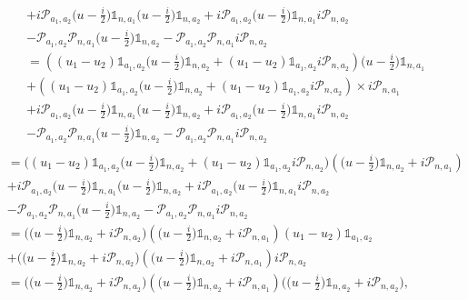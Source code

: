 \documentclass{homework}
\begin{document}
\begin{align*}
    &+ i \bm{\mathcal{P}}_{a_1, a_2} \bigg(u-\frac{i}{2}\bigg) \mathds{1}_{n, a_1}  \bigg(u-\frac{i}{2}\bigg) \mathds{1}_{n, a_2} + i \bm{\mathcal{P}}_{a_1, a_2} \bigg(u-\frac{i}{2}\bigg) \mathds{1}_{n, a_1} i \bm{\mathcal{P}}_{n, a_2} \\
    & - \bm{\mathcal{P}}_{a_1, a_2}  \bm{\mathcal{P}}_{n, a_1}  \bigg(u-\frac{i}{2}\bigg) \mathds{1}_{n, a_2} - \bm{\mathcal{P}}_{a_1, a_2}  \bm{\mathcal{P}}_{n, a_1} i \bm{\mathcal{P}}_{n, a_2} \\
    &= \left({(u_1-u_2) \mathds{1}_{a_1, a_2}  \bigg(u-\frac{i}{2}\bigg) \mathds{1}_{n, a_2}} + {(u_1-u_2) \mathds{1}_{a_1, a_2} i \bm{\mathcal{P}}_{n, a_2}}\right) \bigg(u-\frac{i}{2}\bigg) \mathds{1}_{n, a_1} \\ 
    &+ \left({(u_1-u_2) \mathds{1}_{a_1, a_2} \bigg(u-\frac{i}{2}\bigg) \mathds{1}_{n, a_2}} + {(u_1-u_2) \mathds{1}_{a_1, a_2} i \bm{\mathcal{P}}_{n, a_2}} \right) \times  i \bm{\mathcal{P}}_{n, a_1} \\
    &+ i \bm{\mathcal{P}}_{a_1, a_2} \bigg(u-\frac{i}{2}\bigg) \mathds{1}_{n, a_1} \bigg(u-\frac{i}{2}\bigg) \mathds{1}_{n, a_2} + i \bm{\mathcal{P}}_{a_1, a_2} \bigg(u-\frac{i}{2}\bigg) \mathds{1}_{n, a_1} i \bm{\mathcal{P}}_{n, a_2} \\
    & - \bm{\mathcal{P}}_{a_1, a_2}  \bm{\mathcal{P}}_{n, a_1}  \bigg(u-\frac{i}{2}\bigg) \mathds{1}_{n, a_2} - \bm{\mathcal{P}}_{a_1, a_2}  \bm{\mathcal{P}}_{n, a_1} i \bm{\mathcal{P}}_{n, a_2} \\
\end{align*}
\begin{align*}
    &= \bigg((u_1-u_2) \mathds{1}_{a_1, a_2} \bigg(u-\frac{i}{2}\bigg) \mathds{1}_{n, a_2} + {(u_1-u_2) \mathds{1}_{a_1, a_2} i \bm{\mathcal{P}}_{n, a_2}} \bigg) \left( \bigg(u-\frac{i}{2}\bigg) \mathds{1}_{n, a_2} + i \bm{\mathcal{P}}_{n, a_1} \right) \\
    &+ i \bm{\mathcal{P}}_{a_1, a_2} \bigg(u-\frac{i}{2}\bigg) \mathds{1}_{n, a_1} \bigg(u-\frac{i}{2}\bigg) \mathds{1}_{n, a_2} + i \bm{\mathcal{P}}_{a_1, a_2} \bigg(u-\frac{i}{2}\bigg) \mathds{1}_{n, a_1} i \bm{\mathcal{P}}_{n, a_2} \\
    & - \bm{\mathcal{P}}_{a_1, a_2}  \bm{\mathcal{P}}_{n, a_1}  \bigg(u-\frac{i}{2}\bigg) \mathds{1}_{n, a_2} - \bm{\mathcal{P}}_{a_1, a_2}  \bm{\mathcal{P}}_{n, a_1} i \bm{\mathcal{P}}_{n, a_2} \\
    &= \bigg( \bigg(u-\frac{i}{2}\bigg) \mathds{1}_{n, a_2}  + { i \bm{\mathcal{P}}_{n, a_2}} \bigg) \left( \bigg(u-\frac{i}{2}\bigg) \mathds{1}_{n, a_2} + i \bm{\mathcal{P}}_{n, a_1} \right) (u_1-u_2) \mathds{1}_{a_1, a_2}  \\
    &+ \bigg( \bigg(u-\frac{i}{2}\bigg) \mathds{1}_{n, a_2}  + { i \bm{\mathcal{P}}_{n, a_2}} \bigg) \left( \bigg(u-\frac{i}{2}\bigg) \mathds{1}_{n, a_2} + i \bm{\mathcal{P}}_{n, a_1} \right)  i \bm{\mathcal{P}}_{n, a_2}  \\
    &= \bigg( \bigg(u-\frac{i}{2}\bigg) \mathds{1}_{n, a_2}  + { i \bm{\mathcal{P}}_{n, a_2}} \bigg) \left( \bigg(u-\frac{i}{2}\bigg) \mathds{1}_{n, a_2} + i \bm{\mathcal{P}}_{n, a_1} \right) \bigg(\bigg(u-\frac{i}{2}\bigg) \mathds{1}_{n, a_2} + i \bm{\mathcal{P}}_{n, a_2} \bigg), 
\end{align*}
\end{document}
